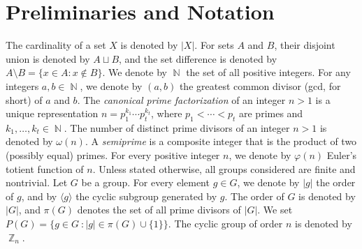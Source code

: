 \documentclass{amsart}
\theoremstyle{plain}
\theoremstyle{definition}
\DeclareMathOperator{\N}{\mathbb{N}}
\DeclareMathOperator{\Z}{\mathbb{Z}}
\begin{document}

\section{Preliminaries and Notation}


\vspace{0.4mm}
The cardinality of a set $X$ is denoted by $|X|$. For sets $A$ and $B$, their disjoint union is denoted by $A\sqcup B$, and the set difference is denoted by $A\setminus B = \{x\in A \colon x\notin B\}$.
We denote by $\N$ the set of all positive integers. For any integers $a, b\in \N$, we denote by $(a,b)$ the greatest common divisor (gcd, for short) of $a$ and $b$. The \emph{canonical prime factorization} of an integer $n>1$ is a unique representation $n= p_1^{k_1}\cdots p_t^{k_t}$, where $p_1<\cdots < p_t$ are primes and $k_1, \ldots, k_t \in \N$. The number of distinct prime divisors of an integer $n>1$ is denoted by $\omega(n)$. A \emph{semiprime} is a composite integer that is the product of two (possibly equal) primes. For every positive integer $n$, we denote by $\varphi(n)$ Euler’s totient function of $n$. Unless stated otherwise, all groups considered are finite and nontrivial. Let $G$ be a group. For every element $g\in G$, we denote by $|g|$ the order of $g$, and by $\langle g \rangle$ the cyclic subgroup generated by $g$. The order of $G$ is denoted by $|G|$, and $\pi(G)$ denotes the set of all prime divisors of $|G|$. We set $P(G) = \bigl\{g\in G\ \colon |g| \in \pi(G)\cup \{1\}\bigr\}$. The cyclic group of order $n$ is denoted by $\Z_n$.
\end{document}
